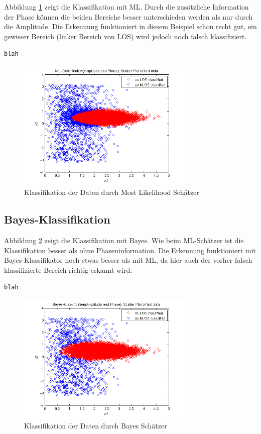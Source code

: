 Abbildung \ref{fig:5_1_2_ml} zeigt die Klassifikation mit ML. Durch die zusätzliche Information der Phase können die beiden Bereiche besser unterschieden werden als nur durch die Amplitude. Die Erkennung funktioniert in diesem Beispiel schon recht gut, ein gewisser Bereich (linker Bereich von LOS) wird jedoch noch falsch klassifiziert.

\texttt{blah}

\begin{figure}[h!]
  \centering
  \includegraphics[width=0.75\textwidth]{./figures/5_1_2_ml.png}
  \caption{Klassifikation der Daten durch Most Likelihood Schätzer}
  \label{fig:5_1_2_ml}
\end{figure}


\subsection{Bayes-Klassifikation}

Abbildung \ref{fig:5_1_2_bayes} zeigt die Klassifikation mit Bayes. Wie beim ML-Schätzer ist die Klassifikation besser als ohne Phaseninformation. Die Erkennung funktioniert mit Bayes-Klassifikator noch etwas besser als mit ML, da hier auch der vorher falsch klassifizierte Bereich richtig erkannt wird.

\texttt{blah}

\begin{figure}[h!]
  \centering
  \includegraphics[width=0.75\textwidth]{./figures/5_1_2_bayes.png}
  \caption{Klassifikation der Daten durch Bayes Schätzer}
  \label{fig:5_1_2_bayes}
\end{figure}
